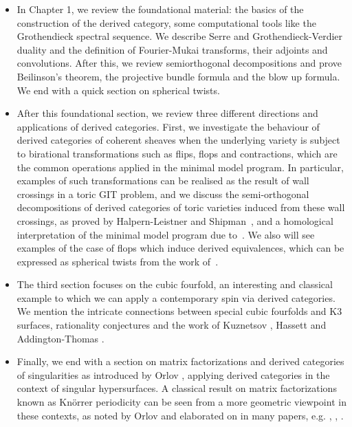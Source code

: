 \begin{itemize}
    \item In Chapter 1, we review the foundational material: the basics of the construction of the derived category, some computational tools like the Grothendieck spectral sequence. We describe Serre and Grothendieck-Verdier duality and the definition of Fourier-Mukai transforms, their adjoints and convolutions. After this, we review semiorthogonal decompositions and prove Beilinson's theorem, the projective bundle formula and the blow up formula. We end with a quick section on spherical twists.
    \item After this foundational section, we review three different directions and applications of derived categories. First, we investigate the behaviour of derived categories of coherent sheaves when the underlying variety is subject to birational transformations such as flips, flops and contractions, which are the common operations applied in the minimal model program. In particular, examples of such transformations can be realised as the result of wall crossings in a toric GIT problem, and we  discuss the semi-orthogonal decompositions of derived categories of toric varieties induced from these wall crossings, as proved by Halpern-Leistner and Shipman~\cite*{halpernleistner2016autoequivalences}, and a homological interpretation of the minimal model program due to~\cite*{ballard_mori_2013,Kite_2022}. We also will see examples of the case of flops which induce derived equivalences, which can be expressed as spherical twists from the work of~\cite*{donovan_window_2014}. 
    \item The third section focuses on the cubic fourfold, an interesting and classical example to which we can apply a contemporary spin via derived categories. We mention the intricate connections between special cubic fourfolds and K3 surfaces, rationality conjectures and the work of Kuznetsov \cite{KuznetsovDerivedCubic}, Hassett \cite{hassett_special_2000} and Addington-Thomas \cite{addington_hodge_2014}. 
    \item Finally, we end with a section on matrix factorizations and derived categories of singularities as introduced by Orlov \cite{OrlovSingularities}, applying derived categories in the context of singular hypersurfaces. A classical result on matrix factorizations known as Kn\"orrer periodicity can be seen from a more geometric viewpoint in these contexts, as noted by Orlov and elaborated on in many papers, e.g. \cite{OrlovKnorrer}, \cite{Shipman}, \cite{Hirano}.
\end{itemize}
